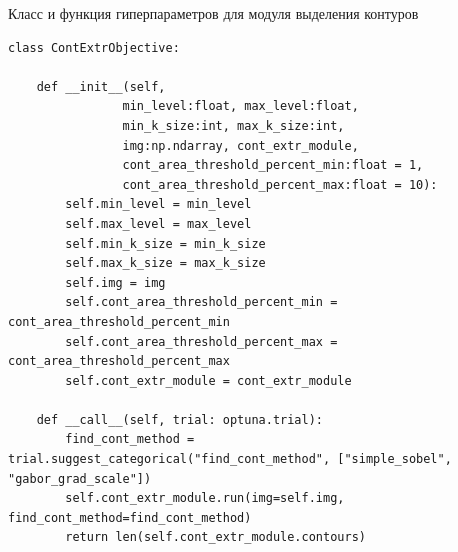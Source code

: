 \documentclass[14pt, russian]{scrartcl}
\begin{document}
\begin{listing}[!htt]
    \caption{Класс и функция гиперпараметров для модуля выделения контуров}
    \label{lst:contour_extr_sobel}
    \begin{verbatim}
class ContExtrObjective:

    def __init__(self, 
                min_level:float, max_level:float,
                min_k_size:int, max_k_size:int,
                img:np.ndarray, cont_extr_module,
                cont_area_threshold_percent_min:float = 1,
                cont_area_threshold_percent_max:float = 10):
        self.min_level = min_level
        self.max_level = max_level
        self.min_k_size = min_k_size
        self.max_k_size = max_k_size
        self.img = img
        self.cont_area_threshold_percent_min = cont_area_threshold_percent_min
        self.cont_area_threshold_percent_max = cont_area_threshold_percent_max
        self.cont_extr_module = cont_extr_module

    def __call__(self, trial: optuna.trial):
        find_cont_method = trial.suggest_categorical("find_cont_method", ["simple_sobel", "gabor_grad_scale"])
        self.cont_extr_module.run(img=self.img, find_cont_method=find_cont_method)
        return len(self.cont_extr_module.contours)
    \end{verbatim}
\end{listing}
\end{document}
